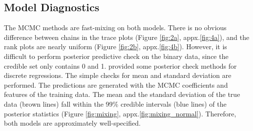 \documentclass[12pt]{article}
\begin{document}
\subsection{Model Diagnostics}
The MCMC methods are fast-mixing on both models. There is no obvious difference between chains in the trace plots (Figure \ref{fig:2a}, appx.\ref{fig:4a}), and the rank plots are nearly uniform (Figure \ref{fig:2b}, appx.\ref{fig:4b}). However, it is difficult to perform posterior predictive check on the binary data, since the credible set only contains 0 and 1. \citet{diag} provided some posterior check methods for discrete regressions. The simple checks for mean and standard deviation are performed. The predictions are generated with the MCMC coefficients and features of the training data. The mean and the standard deviation of the true data (brown lines) fall within the 99\% credible intervals (blue lines) of the posterior statistics (Figure \ref{fig:mixing}, appx.\ref{fig:mixing_normal}). Therefore, both models are approximately well-specified.
\end{document}
